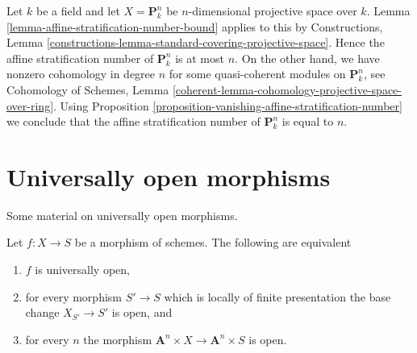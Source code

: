 \begin{example}
\label{example-affine-stratification-number}
Let $k$ be a field and let $X = \mathbf{P}^n_k$ be $n$-dimensional projective
space over $k$. Lemma \ref{lemma-affine-stratification-number-bound}
applies to this by Constructions, Lemma
\ref{constructions-lemma-standard-covering-projective-space}.
Hence the affine stratification number of $\mathbf{P}^n_k$ is
at most $n$. On the other hand, we have nonzero cohomology
in degree $n$ for some quasi-coherent modules on
$\mathbf{P}^n_k$, see
Cohomology of Schemes, Lemma
\ref{coherent-lemma-cohomology-projective-space-over-ring}.
Using Proposition \ref{proposition-vanishing-affine-stratification-number}
we conclude that the affine stratification number of
$\mathbf{P}^n_k$ is equal to $n$.
\end{example}








\section{Universally open morphisms}
\label{section-universally-open}

\noindent
Some material on universally open morphisms.

\begin{lemma}
\label{lemma-test-universally-open}
Let $f : X \to S$ be a morphism of schemes.
The following are equivalent
\begin{enumerate}
\item $f$ is universally open,
\item for every morphism $S' \to S$ which is locally of finite presentation
the base change $X_{S'} \to S'$ is open, and
\item for every $n$ the morphism
$\mathbf{A}^n \times X \to \mathbf{A}^n \times S$
is open.
\end{enumerate}
\end{lemma}

